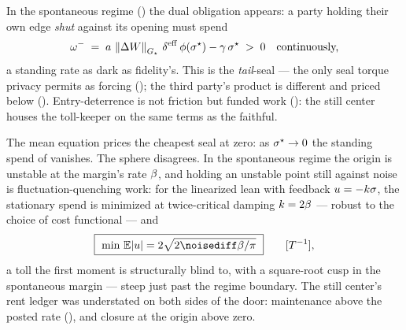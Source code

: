\documentclass[../main]{subfiles}
\begin{document}
\begin{theorem}\PaperHeadingBreak%
  In the spontaneous regime () the dual obligation appears: a party
  holding their own edge \emph{shut} against its opening must spend
  \begin{equation}
    \willanti \;=\; \hingeA\,\normG{\surplus}\,\effdensity\,\bendfn(\alignfixed)
      -\decayrate\,\alignfixed\;>\;0
    \quad\text{continuously,}
    \label{eq:J:seal}
  \end{equation}
  a standing rate as dark as fidelity's. This is the \emph{tail}-seal --- the only seal
  torque privacy permits as forcing (); the third party's product is
  different and priced below (). Entry-deterrence is not friction but
  funded work (): the still center houses the toll-keeper on the same
  terms as the faithful.
\end{theorem}

\begin{corollary}%
  The mean equation prices the cheapest seal at zero: as $\sigma\sp{\star}\to0$ the standing
  spend of  vanishes. The sphere disagrees. In the spontaneous regime
  the origin is unstable at the margin's rate $\beta$, and holding an unstable point
  still against noise is fluctuation-quenching work: for the linearized lean with
  feedback $u=-k\sigma$, the stationary spend is minimized at twice-critical damping
  $k=2\beta$ --- robust to the choice of cost functional --- and
  \begin{equation}
    \boxed{\ \min\,\mathbb E\lvert u\rvert=2\sqrt{2\noisediff\biforce/\pi}\ }
    \qquad\dimrate,
    \label{eq:seal:floor}
  \end{equation}
  a toll the first moment is structurally blind to, with a square-root cusp in the
  spontaneous margin --- steep just past the regime boundary. The still center's rent
  ledger was understated on both sides of the door: maintenance above the posted rate
  (), and closure at the origin above zero.
\end{corollary}
\end{document}
